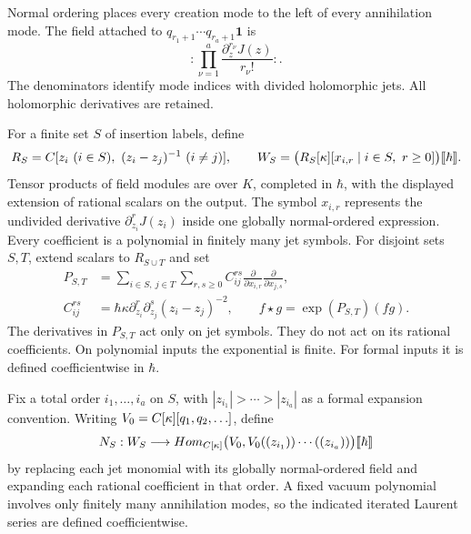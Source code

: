 Normal ordering places every creation mode to the left of every
annihilation mode.  The field attached to
$q_{r_1+1}\cdots q_{r_a+1}\mathbf1$ is
\[
 :\prod_{\nu=1}^a\frac{\partial_z^{r_\nu}J(z)}{r_\nu!}:.
\]
The denominators identify mode indices with divided holomorphic jets.
All holomorphic derivatives are retained.

For a finite set $S$ of insertion labels, define
\[
 R_S=\C[z_i\ (i\in S),\ (z_i-z_j)^{-1}\ (i\ne j)],
 \qquad
 W_S=\bigl(R_S[\kappa][x_{i,r}\mid i\in S,\ r\ge0]\bigr)
            \llbracket\hbar\rrbracket.
\]
Tensor products of field modules are over $K$, completed in $\hbar$,
with the displayed extension of rational scalars on the output.
The symbol $x_{i,r}$ represents the undivided derivative
$\partial_{z_i}^rJ(z_i)$ inside one globally normal-ordered expression.
Every coefficient is a polynomial in finitely many jet symbols.  For disjoint
sets $S,T$, extend scalars to $R_{S\cup T}$ and set
\begin{equation*}
 \begin{split}
 P_{S,T}&=\sum_{i\in S,\ j\in T}\sum_{r,s\ge0}
 C_{ij}^{rs}\frac{\partial}{\partial x_{i,r}}
              \frac{\partial}{\partial x_{j,s}},\\
 C_{ij}^{rs}&=\hbar\kappa\partial_{z_i}^r\partial_{z_j}^s
                    (z_i-z_j)^{-2},\qquad
 f\star g=\exp(P_{S,T})(fg).
 \end{split}
\end{equation*}
The derivatives in $P_{S,T}$ act only on jet symbols.  They do not act on
its rational coefficients.  On polynomial inputs the exponential is finite.
For formal inputs it is defined coefficientwise in $\hbar$.

Fix a total order $i_1,\ldots,i_a$ on $S$, with
$|z_{i_1}|>\cdots>|z_{i_a}|$ as a formal expansion convention.
Writing $V_0=C[\kappa][q_1,q_2,\ldots]$, define
\[
 N_S:W_S\longrightarrow
 Hom_{C[\kappa]}\bigl(V_0,
 V_0((z_{i_1}))\cdots((z_{i_a}))\bigr)\llbracket\hbar\rrbracket
\]
by replacing each jet monomial with its globally normal-ordered field
and expanding each rational coefficient in that order.  A fixed vacuum
polynomial involves only finitely many annihilation modes, so the indicated
iterated Laurent series are defined coefficientwise.

